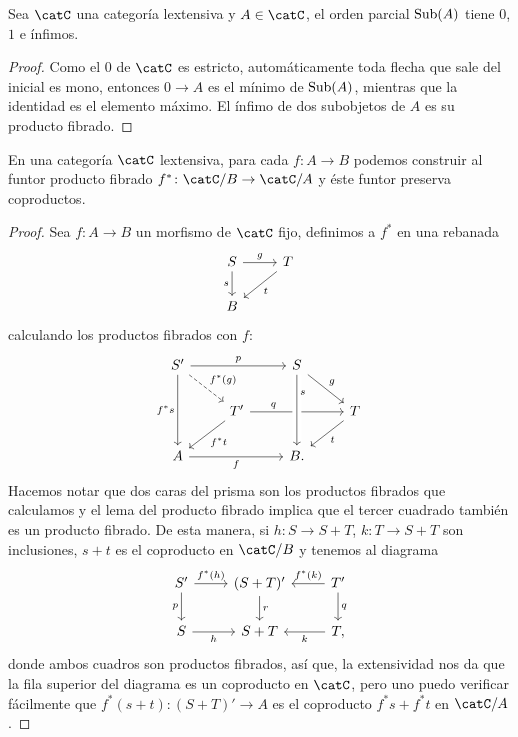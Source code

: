 \begin{proposition}
  Sea $\catC$ una categoría lextensiva y $A\in\catC$, el orden parcial $\operatorname{Sub}(A)$
  tiene $0$, $1$ e ínfimos.
\end{proposition}
\begin{proof}
  Como el $0$ de $\catC$ es estricto, automáticamente toda flecha que sale del inicial es mono,
  entonces $0\to A$ es el mínimo de $\operatorname{Sub}(A)$, mientras que la identidad es el elemento máximo.
  El ínfimo de dos subobjetos de $A$ es su producto fibrado.
\end{proof}

\begin{proposition}
  En una categoría $\catC$ lextensiva, para cada $f\colon A\to B$ podemos construir al
  funtor producto fibrado $f^*\colon\catC/B\to\catC/A$ y éste funtor preserva coproductos. 
\end{proposition}
\begin{proof}
  Sea $f\colon A\to B$ un morfismo de $\catC$ fijo, definimos a $f^*$ en una rebanada
  \begin{equation*}
    \begin{tikzcd}
      S\ar{r}{g}\ar[swap]{d}{s} & T\ar{ld}{t} \\
      B
    \end{tikzcd}
  \end{equation*}
  calculando los productos fibrados con $f$:
  \begin{equation*}
    \begin{tikzcd}
      S'\ar{rr}{p}\ar[dashed]{rd}{f^*(g)}\ar[swap]{dd}{f^*s} & {} & S\ar{rd}{g} \\
      {} & T'\ar[near start]{rr}{q}\ar{ld}{f^*t} & {} & T\ar{ld}{t} \\
      A\ar[swap]{rr}{f} & {} & B.
      \ar[from=1-3, to=3-3, crossing over, "s"{near start}]
    \end{tikzcd}
  \end{equation*}
  Hacemos notar que dos caras del prisma son los productos fibrados que calculamos
  y el lema del producto fibrado implica que el tercer cuadrado también es un producto fibrado.
  De esta manera, si $h\colon S\to S+T$, $k\colon T\to S+T$ son inclusiones, $s+t$ es 
  el coproducto en $\catC/B$ y tenemos al diagrama
  \begin{equation*}
    \begin{tikzcd}
      S'\ar{r}{f^*(h)}\ar[swap]{d}{p} & (S+T)'\ar{d}{r} & T'\ar[swap]{l}{f^*(k)}\ar{d}{q} \\
      S\ar[swap]{r}{h} & S+T & T,\ar{l}{k}
    \end{tikzcd}
  \end{equation*}
  donde ambos cuadros son productos fibrados, así que, la extensividad nos da que
  la fila superior del diagrama es un coproducto en $\catC$, pero uno puedo verificar fácilmente
  que $f^*(s+t)\colon(S+T)'\to A$ es el coproducto $f^*s+f^*t$ en $\catC/A$. 
\end{proof}

